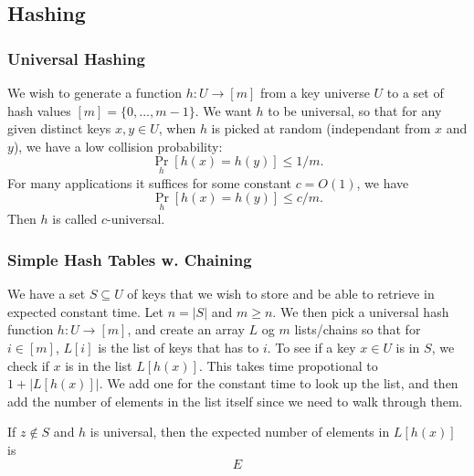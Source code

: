 \subsection{Hashing}

\subsubsection{Universal Hashing}
We wish to generate a function $h : U \rightarrow [m]$ from a key universe $U$
to a set of hash values $[m] = \{ 0, ..., m-1 \}$.  We want $h$ to be universal,
so that for any given distinct keys $x,y \in U$, when $h$ is picked at random
(independant from $x$ and $y$), we have a low collision probability:
\[
  \underset{h}{\Pr}[h(x) = h(y)] \leq 1/m.
\]
For many applications it suffices for some constant $c = O(1)$, we have
\[
  \underset{h}{\Pr}[h(x) = h(y)] \leq c/m.
\]
Then $h$ is called $c$-universal.

\subsubsection{Simple Hash Tables w. Chaining}
We have a set $S \subseteq U$ of keys that we wish to store and be able to retrieve in expected constant time.
Let $n = |S|$ and $m \geq n$. We then pick a universal hash function $h : U \rightarrow [m]$, and create an array $L$ og $m$ lists/chains so that for $i\in[m]$,
$L[i]$ is the list of keys that has  to $i$.
To see if a key $x\in U$ is in $S$, we check if $x$ is in the list $L[h(x)]$. This takes time propotional to $1+|L[h(x)]|$.
We add one for the constant time to look up the list, and then add the number of elements in the list itself since we need to walk through them.

If $z \notin S$ and $h$ is universal, then the expected number of elements in $L[h(x)]$ is
\[
  E
\]
